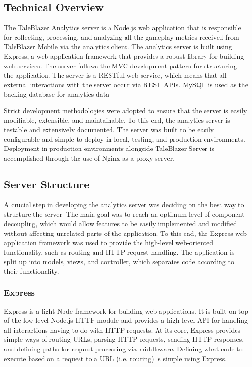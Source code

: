 \subsection{Technical Overview}

The TaleBlazer Analytics server is a Node.js web application that is responsible for collecting, processing, and analyzing all the gameplay metrics received from TaleBlazer Mobile via the analytics client. The analytics server is built using Express, a web application framework that provides a robust library for building web services. The server follows the MVC development pattern for structuring the application. The server is a RESTful web service, which means that all external interactions with the server occur via REST APIs. MySQL is used as the backing database for analytics data.

Strict development methodologies were adopted to ensure that the server is easily modifiable, extensible, and maintainable. To this end, the analytics server is testable and extensively documented. The server was built to be easily configurable and simple to deploy in local, testing, and production environments. Deployment in production environments alongside TaleBlazer Server is accomplished through the use of Nginx as a proxy server.

\subsection{Server Structure}

A crucial step in developing the analytics server was deciding on the best way to structure the server. The main goal was to reach an optimum level of component decoupling, which would allow features to be easily implemented and modified without affecting unrelated parts of the application. To this end, the Express web application framework was used to provide the high-level web-oriented functionality, such as routing and HTTP request handling. The application is split up into models, views, and controller, which separates code according to their functionality. 

\subsubsection{Express}
Express is a light Node framework for building web applications. It is built on top of the low-level Node.js HTTP module and provides a high-level API for handling all interactions having to do with HTTP requests. At its core, Express provides simple ways of routing URLs, parsing HTTP requests, sending HTTP responses, and defining paths for request processing via middleware. Defining what code to execute based on a request to a URL (i.e. routing) is simple using Express.

